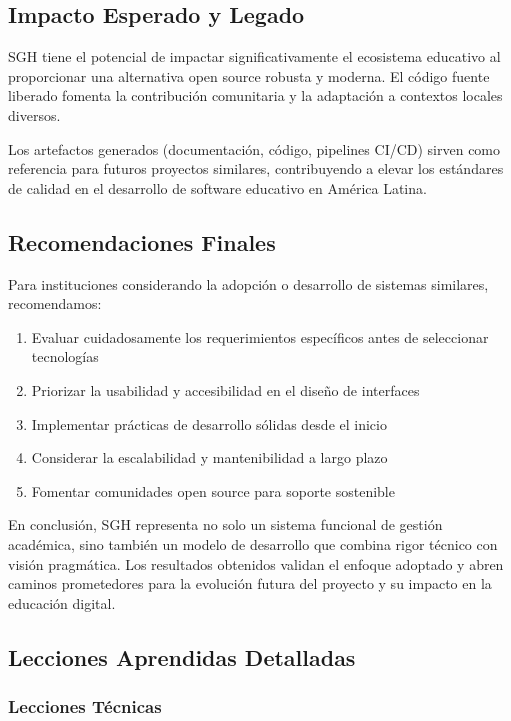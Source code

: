 \subsection{Impacto Esperado y Legado}

SGH tiene el potencial de impactar significativamente el ecosistema educativo al proporcionar una alternativa open source robusta y moderna. El código fuente liberado fomenta la contribución comunitaria y la adaptación a contextos locales diversos.

Los artefactos generados (documentación, código, pipelines CI/CD) sirven como referencia para futuros proyectos similares, contribuyendo a elevar los estándares de calidad en el desarrollo de software educativo en América Latina.

\subsection{Recomendaciones Finales}

Para instituciones considerando la adopción o desarrollo de sistemas similares, recomendamos:

\begin{enumerate}
\item Evaluar cuidadosamente los requerimientos específicos antes de seleccionar tecnologías
\item Priorizar la usabilidad y accesibilidad en el diseño de interfaces
\item Implementar prácticas de desarrollo sólidas desde el inicio
\item Considerar la escalabilidad y mantenibilidad a largo plazo
\item Fomentar comunidades open source para soporte sostenible
\end{enumerate}

En conclusión, SGH representa no solo un sistema funcional de gestión académica, sino también un modelo de desarrollo que combina rigor técnico con visión pragmática. Los resultados obtenidos validan el enfoque adoptado y abren caminos prometedores para la evolución futura del proyecto y su impacto en la educación digital.

\subsection{Lecciones Aprendidas Detalladas}

\subsubsection{Lecciones Técnicas}

